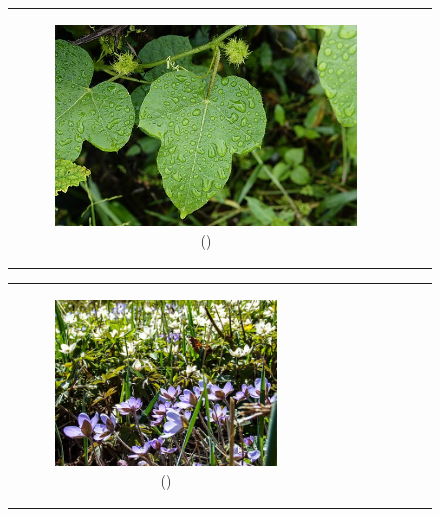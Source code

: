 \documentclass{BachelorBUI}
\begin{document}
\begin{figure}[h]
\begin{tabular}{ccc}
\begin{subfigure}{0.30\textwidth}
                    \includegraphics[width=\textwidth]{6_artificial_background.jpg}
                    \caption{\centering (\cite{6_artificial_background:2017})}
                \end{subfigure} \\
            \end{tabular}
            \begin{tabular}{ccc}
                \begin{subfigure}{0.30\textwidth}
                    \centering
                    \includegraphics[width=\textwidth]{7_artificial_background.jpg}
                    \caption{\centering (\cite{7_artificial_background:2019})}
                \end{subfigure} &
                \begin{subfigure}{0.30\textwidth}

\end{subfigure}
\end{tabular}
\end{figure}
\end{document}

